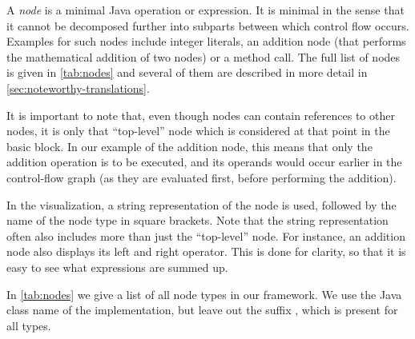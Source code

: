 \begin{definition}[Nodes]
    \label{def:node}
    A \emph{node} is a minimal Java operation or expression.
    It is minimal in the sense that it cannot be decomposed further into subparts
    between which control flow occurs. Examples for such nodes include integer literals,
    an addition node (that performs the mathematical addition of two nodes) or a method call.
    The full list of nodes is given in \autoref{tab:nodes} and several of them
    are described in more detail in \autoref{sec:noteworthy-translations}.
    
    It is important to note that, even though nodes can contain references to other nodes,
    it is only that ``top-level'' node which is considered at that point in the basic
    block. In our example of the addition node, this means that only the addition operation
    is to be executed, and its operands would occur earlier in the control-flow graph
    (as they are evaluated first, before performing the addition).
\end{definition}

In the visualization, a string representation of the node is used, followed by the name
of the node type in square brackets. Note that the string representation often also includes
more than just the ``top-level'' node. For instance, an addition node also displays its
left and right operator. This is done for clarity, so that it is easy to see what
expressions are summed up.

In \autoref{tab:nodes} we give a list of all node types in our framework. We use the
Java class name of the implementation, but leave out the suffix , which is present
for all types.

